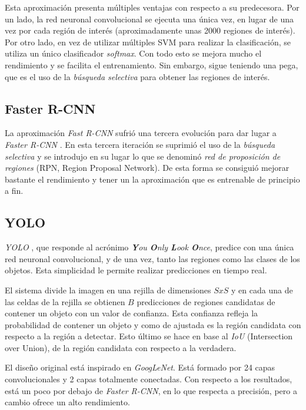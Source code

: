 Esta aproximación presenta múltiples ventajas con respecto a su predecesora. Por un lado, la red neuronal convolucional se ejecuta una única vez, en lugar de una vez por cada región de interés (aproximadamente unas 2000 regiones de interés). Por otro lado, en vez de utilizar múltiples SVM para realizar la clasificación, se utiliza un único clasificador \textit{softmax}. Con todo esto se mejora mucho el rendimiento y se facilita el entrenamiento. Sin embargo, sigue teniendo una pega, que es el uso de la \textit{búsqueda selectiva} para obtener las regiones de interés.

\subsection*{Faster R-CNN}

La aproximación \textit{Fast R-CNN} sufrió una tercera evolución para dar lugar a \textit{Faster R-CNN} \cite{s2_stateofart_fasterrcnn}. En esta tercera iteración se suprimió el uso de la \textit{búsqueda selectiva} y se introdujo en su lugar lo que se denominó \textit{red de proposición de regiones} (RPN, Region Proposal Network). De esta forma se consiguió mejorar bastante el rendimiento y tener un la aproximación que es entrenable de principio a fin.

\subsection*{YOLO}

\textit{YOLO} , que responde al acrónimo \textit{\textbf{Y}ou \textbf{O}nly \textbf{L}ook \textbf{O}nce}, predice con una única red neuronal convolucional, y de una vez, tanto las regiones como las clases de los objetos. Esta simplicidad le permite realizar predicciones en tiempo real.

El sistema divide la imagen en una rejilla de dimensiones $SxS$ y en cada una de las celdas de la rejilla se obtienen $B$ predicciones de regiones candidatas de contener un objeto con un valor de confianza. Esta confianza refleja la probabilidad de contener un objeto y como de ajustada es la región candidata con respecto a la región a detectar. Esto último se hace en base al \textit{IoU} (Intersection over Union), de la región candidata con respecto a la verdadera.

El diseño original está inspirado en \textit{GoogLeNet}. Está formado por 24 capas convolucionales y 2 capas totalmente conectadas. Con respecto a los resultados, está un poco por debajo de \textit{Faster R-CNN}, en lo que respecta a precisión, pero a cambio ofrece un alto rendimiento.

